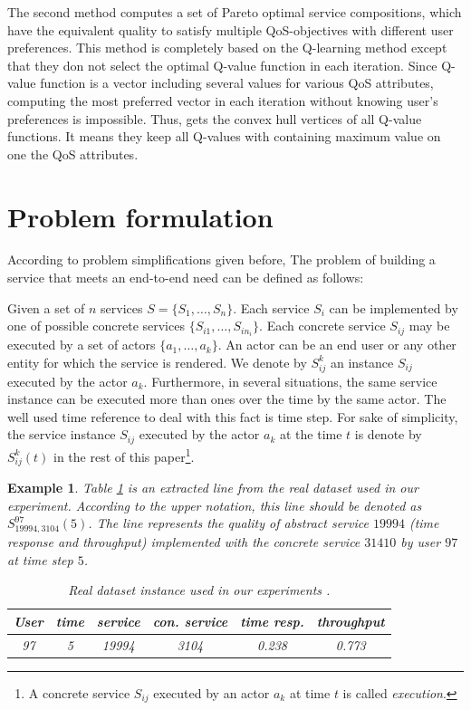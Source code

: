 \documentclass[10pt,journal,compsoc]{IEEEtran}
\newtheorem{example}{Example}
\begin{document}
 The second method computes a set of Pareto optimal service compositions, which have the equivalent quality to satisfy multiple QoS-objectives with different user preferences. This method is completely based on the Q-learning method except that they don not select the optimal Q-value function in each iteration. Since Q-value function is a vector including several values for various QoS attributes, computing the most preferred vector in each iteration without knowing user's preferences is impossible. Thus,  \cite{Mostafa2015} gets the convex hull vertices of all Q-value functions. It means they keep all Q-values with containing maximum value on one the QoS attributes. 

\section{Problem formulation}\label{section:problem-formulation}

According to problem simplifications given before, The problem of building a service that meets an end-to-end need can be defined as follows: 

Given a set of $n$ services $S=\{S_1,\dots, S_n\}$. Each service $S_i$ can be implemented by one of possible concrete services $\{ S_{i1}, \dots, S_{in_i}\}$. Each concrete service $S_{ij}$ may be executed by a set of actors $\{a_1, \dots, a_k\}$. An actor can be an end user or any other entity for which the service is rendered. We denote by  $S_{ij}^k$ an instance $S_{ij}$ executed by the actor $a_k$. Furthermore, in several situations, the same service instance can be executed more than ones over the time by the same actor. The well used time reference to deal with this fact is time step. For sake of simplicity, the service instance $S_{ij}$ executed by the actor $a_k$ at the time $t$ is denote by $S_{ij}^k(t)$ in the rest of this paper\footnote{A concrete service $S_{ij}$ executed by an actor $a_k$ at time $t$ is called {\it execution}.}. 

\begin{example} Table \ref{table:realdb:exmpl} is an extracted line from the real dataset \cite{Zheng2014,Zheng2015} used in our experiment. According to the upper notation, this line should be denoted as $S_{19994,3104}^{97}(5)$. The line represents the quality of abstract service $19994$ (time response and throughput) implemented with the concrete service $31410$ by user $97$ at time step $5$.	

\begin{table}[htp]
\caption{Real dataset instance used in our experiments \cite{Zheng2014,Zheng2015}.}
\begin{center}
\begin{tabular}{|c|c|c|c|c|c|}
\hline
User&time&service&con. service& time resp.& throughput  \\
\hline
97& 5& 19994& 3104&0.238&0.773\\
\hline
\end{tabular}
\end{center}
\label{table:realdb:exmpl}
\end{table}%
\label{example:DB}
\end{example}
\end{document}
